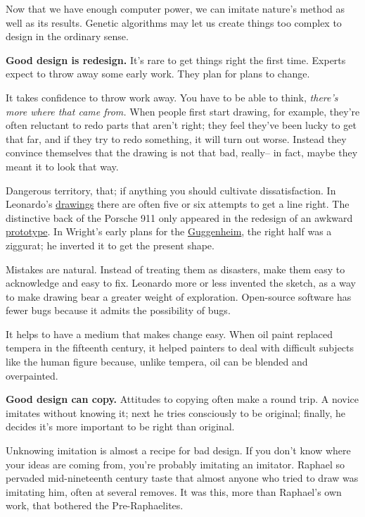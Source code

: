 \documentclass[12pt]{book}
\begin{document}
Now that we have enough computer power, we can imitate nature's method
as well as its results. Genetic algorithms may let us create things too
complex to design in the ordinary sense.

\textbf{Good design is redesign.} It's rare to get things right the
first time. Experts expect to throw away some early work. They plan for
plans to change.

It takes confidence to throw work away. You have to be able to think,
\emph{there's more where that came from.} When people first start
drawing, for example, they're often reluctant to redo parts that aren't
right; they feel they've been lucky to get that far, and if they try to
redo something, it will turn out worse. Instead they convince themselves
that the drawing is not that bad, really-- in fact, maybe they meant it
to look that way.

Dangerous territory, that; if anything you should cultivate
dissatisfaction. In Leonardo's \href{leonardo.html}{drawings} there are
often five or six attempts to get a line right. The distinctive back of
the Porsche 911 only appeared in the redesign of an awkward
\href{porsche695.html}{prototype}. In Wright's early plans for the
\href{guggen.html}{Guggenheim}, the right half was a ziggurat; he
inverted it to get the present shape.

Mistakes are natural. Instead of treating them as disasters, make them
easy to acknowledge and easy to fix. Leonardo more or less invented the
sketch, as a way to make drawing bear a greater weight of exploration.
Open-source software has fewer bugs because it admits the possibility of
bugs.

It helps to have a medium that makes change easy. When oil paint
replaced tempera in the fifteenth century, it helped painters to deal
with difficult subjects like the human figure because, unlike tempera,
oil can be blended and overpainted.

\textbf{Good design can copy.} Attitudes to copying often make a round
trip. A novice imitates without knowing it; next he tries consciously to
be original; finally, he decides it's more important to be right than
original.

Unknowing imitation is almost a recipe for bad design. If you don't know
where your ideas are coming from, you're probably imitating an imitator.
Raphael so pervaded mid-nineteenth century taste that almost anyone who
tried to draw was imitating him, often at several removes. It was this,
more than Raphael's own work, that bothered the Pre-Raphaelites.
\end{document}
